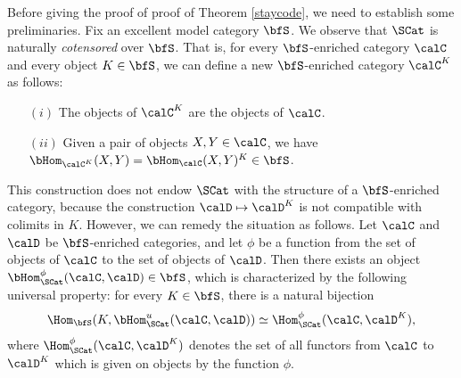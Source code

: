 Before giving the proof of proof of Theorem \ref{staycode}, we need to establish some preliminaries.
Fix an excellent model category $\bfS$. We observe
that $\SCat$ is naturally {\em cotensored} over $\bfS$. That is, for
every $\bfS$-enriched category $\calC$ and every object $K \in \bfS$, we can define a new $\bfS$-enriched category $\calC^{K}$ as follows:

\begin{itemize}
\item[$(i)$] The objects of $\calC^{K}$ are the objects of $\calC$.
\item[$(ii)$] Given a pair of objects $X,Y \in \calC$, we have
$\bHom_{\calC^{K}}(X,Y) = \bHom_{\calC}(X,Y)^{K} \in \bfS$. 
\end{itemize} 

This construction does not endow $\SCat$ with the structure of a $\bfS$-enriched category, because
the construction $\calD \mapsto \calD^{K}$ is not compatible with colimits in $K$. However,
we can remedy the situation as follows. Let $\calC$ and $\calD$ be $\bfS$-enriched categories,
and let $\phi$ be a function from the set of objects of $\calC$ to the set of objects of $\calD$. Then
there exists an object $\bHom_{\SCat}^{\phi}( \calC, \calD) \in \bfS$, which is characterized by the following universal property: for every $K \in \bfS$, there is a natural bijection
$$ \Hom_{\bfS}(K, \bHom_{\SCat}^{u}(\calC, \calD) ) \simeq \Hom^{\phi}_{\SCat}(\calC, \calD^{K} ),$$
where $\Hom^{\phi}_{\SCat}(\calC, \calD^{K} )$ denotes the set of all functors from
$\calC$ to $\calD^{K}$ which is given on objects by the function $\phi$.


